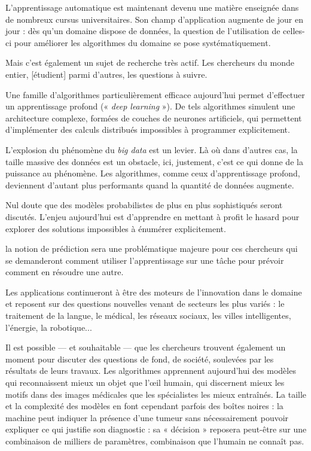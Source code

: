 
L’apprentissage automatique est maintenant devenu une matière enseignée dans de nombreux cursus universitaires. Son champ d’application augmente de jour en jour : dès qu’un domaine dispose de données, la question de l’utilisation de celles-ci pour améliorer les algorithmes du domaine se pose systématiquement.

Mais c’est également un sujet de recherche très actif. Les chercheurs du monde entier, [étudient] parmi d’autres, les questions à suivre.
\begin{jazzitemize}
\item Une famille d’algorithmes particulièrement efficace aujourd’hui permet d’effectuer un apprentissage profond (« \textit{deep learning} »). De tels algorithmes simulent une architecture complexe, formées de couches de neurones artificiels, qui permettent d’implémenter des calculs distribués impossibles à programmer explicitement.
\item L’explosion du phénomène du \textit{big data} est un levier. Là où dans d’au\-tres cas, la taille massive des données est un obstacle, ici, justement, c’est ce qui donne de la puissance au phénomène. Les algorithmes, comme ceux d’apprentissage profond, deviennent d’autant plus performants quand la quantité de données augmente.
\item Nul doute que des modèles probabilistes de plus en plus sophistiqués seront discutés. L’enjeu aujourd’hui est d’apprendre en mettant à profit le hasard pour explorer des solutions impossibles à énumérer explicitement.
\item la notion de prédiction sera une problématique majeure pour ces chercheurs qui se demanderont comment utiliser l’apprentissage sur une tâche pour prévoir comment en résoudre une autre.
\item Les applications continueront à être des moteurs de l’innovation dans le domaine et reposent sur des questions nouvelles venant de secteurs les plus variés : le traitement de la langue, le médical, les réseaux sociaux, les villes intelligentes, l’énergie, la robotique...
\end{jazzitemize}


Il est possible --- et souhaitable --- que les chercheurs trouvent également un moment pour discuter des questions de fond, de société, soulevées par les résultats de leurs travaux. Les algorithmes appren\-nent aujourd’hui des modèles qui reconnaissent mieux un objet que l’œil humain, qui discernent mieux les motifs dans des images médicales que les spécialistes les mieux entraînés. La taille et la complexité des modèles en font cependant parfois des boîtes noires : la machine peut indiquer la présence d’une tumeur sans nécessairement pouvoir expliquer ce qui justifie son diagnostic : sa « décision » reposera peut-être sur une combinaison de milliers de paramètres, combinaison que l’humain ne connaît pas.

